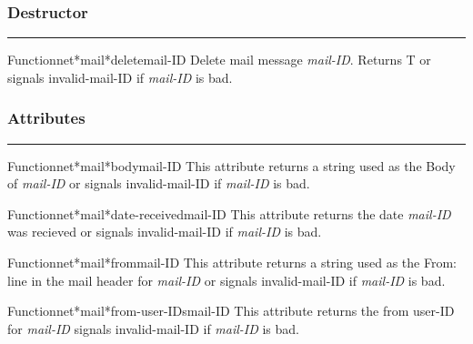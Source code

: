 \subsubsection*{Destructor}
\par\vspace*{0.00in}\par\hrule\par\medskip\par


\begin{functiondoc}{Function}{net*mail*delete}{mail-ID}
Delete mail message {\em mail-ID}.
Returns T or signals invalid-mail-ID if {\em mail-ID} is bad.
\end{functiondoc}


\subsubsection*{Attributes}
\par\vspace*{0.00in}\par\hrule\par\medskip\par


\begin{functiondoc}{Function}{net*mail*body}{mail-ID}
This attribute returns a string used as the Body of
{\em mail-ID} or signals invalid-mail-ID if {\em mail-ID} is bad.
\end{functiondoc}

\begin{functiondoc}{Function}{net*mail*date-received}{mail-ID}
This attribute returns the date {\em mail-ID} was recieved or signals 
invalid-mail-ID if {\em mail-ID} is bad.
\end{functiondoc}

\begin{functiondoc}{Function}{net*mail*from}{mail-ID}
This attribute returns a string used as the From: line in the mail header for
{\em mail-ID} or signals invalid-mail-ID if {\em mail-ID} is bad.
\end{functiondoc}

\begin{functiondoc}{Function}{net*mail*from-user-IDs}{mail-ID}
This attribute returns the from user-ID for {\em mail-ID} signals 
invalid-mail-ID if {\em mail-ID} is bad.
\end{functiondoc}

